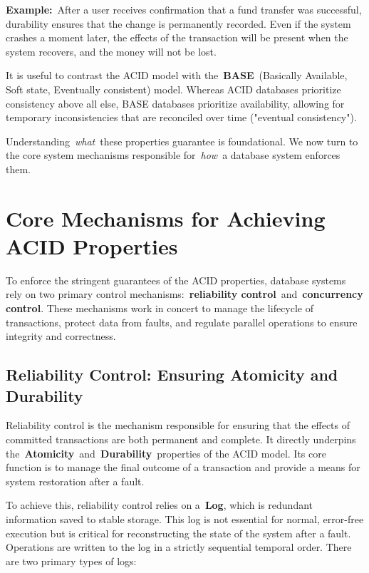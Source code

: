 \documentclass{scrbook}
\begin{document}
\textbf{Example:}~After a user receives confirmation that a fund
transfer was successful, durability ensures that the change is
permanently recorded. Even if the system crashes a moment later, the
effects of the transaction will be present when the system recovers, and
the money will not be lost.

It is useful to contrast the ACID model with
the~\textbf{BASE}~(Basically Available, Soft state, Eventually
consistent) model. Whereas ACID databases prioritize consistency above
all else, BASE databases prioritize availability, allowing for temporary
inconsistencies that are reconciled over time ("eventual consistency").

Understanding~\emph{what}~these properties guarantee is foundational. We
now turn to the core system mechanisms responsible for~\emph{how}~a
database system enforces them.

\section{Core Mechanisms for Achieving ACID Properties}

To enforce the stringent guarantees of the ACID properties, database
systems rely on two primary control mechanisms:~\textbf{reliability
control}~and~\textbf{concurrency control}. These mechanisms work in
concert to manage the lifecycle of transactions, protect data from
faults, and regulate parallel operations to ensure integrity and
correctness.

\subsection{Reliability Control: Ensuring Atomicity and Durability}

Reliability control is the mechanism responsible for ensuring that the
effects of committed transactions are both permanent and complete. It
directly underpins
the~\textbf{Atomicity}~and~\textbf{Durability}~properties of the ACID
model. Its core function is to manage the final outcome of a transaction
and provide a means for system restoration after a fault.

To achieve this, reliability control relies on a~\textbf{Log}, which is
redundant information saved to stable storage. This log is not essential
for normal, error-free execution but is critical for reconstructing the
state of the system after a fault. Operations are written to the log in
a strictly sequential temporal order. There are two primary types of
logs:
\end{document}
